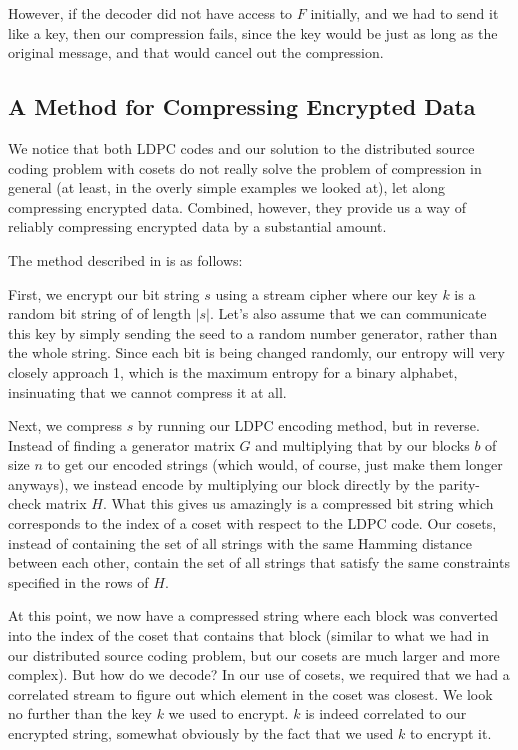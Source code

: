 \documentclass[11pt]{article}
\begin{document}
However, if the decoder did not have access to $F$ initially, and we had to send it like a key, 
then our compression fails, since the key would be just as long as the original message, 
and that would cancel out the compression. 

\subsection{A Method for Compressing Encrypted Data}\label{method-ce-subsect}
We notice that both LDPC codes and our solution to the distributed source coding problem with cosets do 
not really solve the problem of compression in general (at least, in the overly simple examples we looked at), 
let along compressing encrypted data. 
Combined, however, they provide us a way of reliably compressing encrypted data by a substantial amount. 

The method described in \cite{johnson} is as follows:

First, we encrypt our bit string $s$ using a stream cipher where our key $k$ is a random bit string of 
of length $|s|$. Let's also assume that we can communicate this key by simply sending 
the seed to a random number generator, rather than the whole string. 
Since each bit is being changed randomly, our entropy will very closely approach 1, which 
is the maximum entropy for a binary alphabet, insinuating that we cannot compress it at all. 

Next, we compress $s$ by running our LDPC encoding method, but in reverse.
Instead of finding a generator matrix $G$ and multiplying that by our blocks $b$ of size $n$ 
to get our encoded strings (which would, of course, just make them longer anyways), 
we instead encode by multiplying our block directly by the parity-check matrix $H$. 
What this gives us amazingly is a compressed bit string which corresponds to the index of a coset 
with respect to the LDPC code. Our cosets, instead of containing the set of all strings with the same 
Hamming distance between each other, contain the set of all strings that satisfy the same constraints specified 
in the rows of $H$. 

At this point, we now have a compressed string where each block was converted into the index 
of the coset that contains that block (similar to what we had in our distributed source coding problem, 
but our cosets are much larger and more complex). But how do we decode? In our use of cosets, we required 
that we had a correlated stream to figure out which element in the coset was closest. 
We look no further than the key $k$ we used to encrypt. $k$ is indeed correlated to our encrypted string, 
somewhat obviously by the fact that we used $k$ to encrypt it. 
\end{document}
